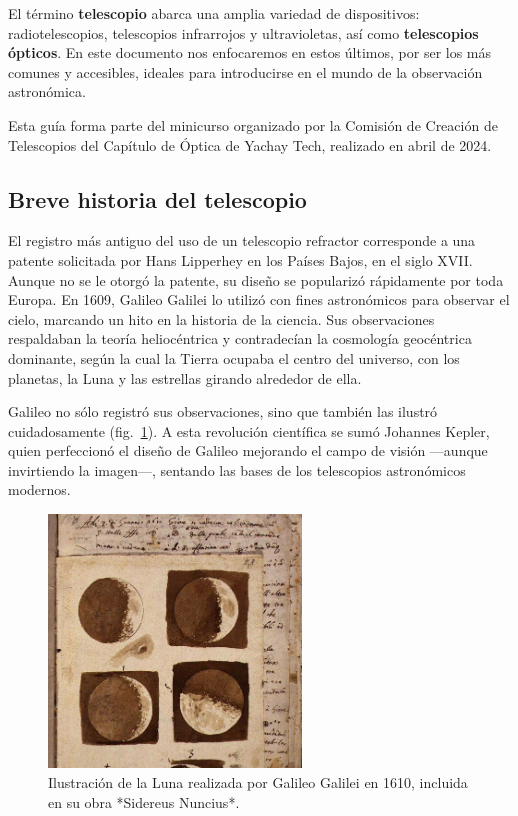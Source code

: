 El término \textbf{telescopio} abarca una amplia variedad de dispositivos: radiotelescopios, telescopios infrarrojos y ultravioletas, así como \textbf{telescopios ópticos}. En este documento nos enfocaremos en estos últimos, por ser los más comunes y accesibles, ideales para introducirse en el mundo de la observación astronómica.

Esta guía forma parte del minicurso organizado por la Comisión de Creación de Telescopios del Capítulo de Óptica de Yachay Tech, realizado en abril de 2024.

\subsection*{Breve historia del telescopio}

El registro más antiguo del uso de un telescopio refractor corresponde a una patente solicitada por Hans Lipperhey en los Países Bajos, en el siglo XVII. Aunque no se le otorgó la patente, su diseño se popularizó rápidamente por toda Europa. En 1609, Galileo Galilei lo utilizó con fines astronómicos para observar el cielo, marcando un hito en la historia de la ciencia. Sus observaciones respaldaban la teoría heliocéntrica y contradecían la cosmología geocéntrica dominante, según la cual la Tierra ocupaba el centro del universo, con los planetas, la Luna y las estrellas girando alrededor de ella.

Galileo no sólo registró sus observaciones, sino que también las ilustró cuidadosamente (fig.~\ref{fig:ilustracion_luna_galileo_1610}). A esta revolución científica se sumó Johannes Kepler, quien perfeccionó el diseño de Galileo mejorando el campo de visión —aunque invirtiendo la imagen—, sentando las bases de los telescopios astronómicos modernos.

\begin{figure}[H]
	\centering
	\includegraphics[width=0.6\textwidth]{images/ilustracion_galileo.jpg}
	\caption{Ilustración de la Luna realizada por Galileo Galilei en 1610, incluida en su obra *Sidereus Nuncius*.}
	\label{fig:ilustracion_luna_galileo_1610}
\end{figure}

